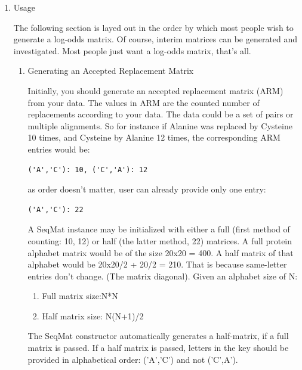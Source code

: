 \documentclass{report}
\begin{document}
\begin{enumerate}
\begin{enumerate}
    The \verb|alphabet| optional argument is a string of all characters in the alphabet. If supplied, the order of letters along the axes is taken from the string, rather than by alphabetical order.

  \end{enumerate}

\item Usage

   The following section is layed out in the order by which most people wish to generate a log-odds matrix. Of course, interim matrices can be generated and
   investigated. Most people just want a log-odds matrix, that's all.
  
   \begin{enumerate}

   \item Generating an Accepted Replacement Matrix

   Initially, you should generate an accepted replacement matrix (ARM) from your data. The values in ARM are the counted number of replacements according to your data. The data could be a set of pairs or multiple alignments. So for instance if Alanine was replaced by Cysteine 10 times, and Cysteine by Alanine 12 times, the corresponding ARM entries would be:

\begin{verbatim}
('A','C'): 10, ('C','A'): 12
\end{verbatim}

as order doesn't matter, user can already provide only one entry:

\begin{verbatim}
('A','C'): 22
\end{verbatim}

 A SeqMat instance may be initialized with either a full (first method of counting: 10, 12) or half (the latter method, 22) matrices. A full protein
   alphabet matrix would be of the size 20x20 = 400. A half matrix of that alphabet would be 20x20/2 + 20/2 = 210. That is because same-letter entries don't
   change. (The matrix diagonal). Given an alphabet size of N:

   \begin{enumerate}
     \item Full matrix size:N*N

     \item Half matrix size: N(N+1)/2
   \end{enumerate}

The SeqMat constructor automatically generates a half-matrix, if a full matrix is passed. If a half matrix is passed, letters in the key should be provided in alphabetical order: ('A','C') and not ('C',A').


\end{enumerate}
\end{enumerate}
\end{document}
